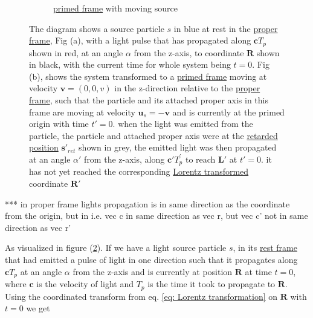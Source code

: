\begin{figure}[H]
\begin{subfigure}{.49\textwidth}
		\caption{\hyperlink{def-Primed-Frame}{primed frame} with moving source}
		\label{fig: primed frame 1}
	\end{subfigure}
	\caption{The diagram shows a source particle $s$ in blue at rest in the \protect\hyperlink{def-proper-frame}{proper frame}, Fig (a), with a light pulse that has propagated along $\mathbf{c} T_{p}$ shown in red, at an angle $\alpha$ from the z-axis, to coordinate $\mathbf{R}$ shown in black, with the current time for whole system being $t=0$.
	Fig (b), shows the system transformed to a \protect\hyperlink{def-Primed-Frame}{primed frame} moving at velocity $\mathbf{v}=(0,0,v)$ in the z-direction relative to the \protect\hyperlink{def-proper-frame}{proper frame}, such that the particle and its attached proper axis in this frame are moving at velocity $\mathbf{u}_s= - \mathbf{v}$ and is currently at the primed origin with time $t'=0$. when the light was emitted from the particle, the particle and attached proper axis were at the \protect\hyperlink{def-retarded-position}{retarded position} $\mathbf{s}'_{ret}$ shown in grey, the emitted light was then propagated at an angle $\alpha'$ from the z-axis, along $\mathbf{c}' T^{'}_{p}$ to reach $\mathbf{L}'$ at $t'=0$. it has not yet reached the corresponding \protect\hyperlink{def-lorentz-transform}{Lorentz transformed} coordinate $\mathbf{R}'$ }
	\label{fig: Retarded field outward field transform}
\end{figure}

*** in proper frame lights propagation is in same direction as the coordinate from the origin, but in i.e. vec c in same direction as vec r, but vec c' not in same direction as vec r'

As visualized in figure (\ref{fig: Retarded field outward field transform}). If we have a light source particle $s$, in its \hyperlink{def-proper-frame}{rest frame} that had emitted a pulse of light in one direction such that it propagates along $\mathbf{c}T_{p}$ at an angle $\alpha$ from the z-axis and is currently at position $\mathbf{R}$ at time $t=0$, where $\mathbf{c}$ is the velocity of light and $T_{p}$ is the time it took to propagate to $\mathbf{R}$.
Using the coordinated transform from eq. \eqref{eq: Lorentz transformation} on $\mathbf{R}$ with $t=0$ we get

